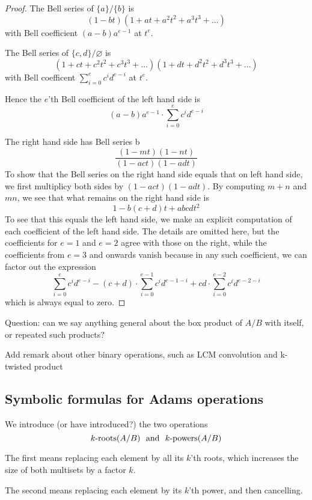 \begin{proof}
The Bell series of $\{  a \} / \{ b \}$ is 
$$(1-bt) (1+at+a^2 t^2 + a^3 t^3 + \ldots)$$
with Bell coefficient $(a-b) a^{e-1}$ at $t^e$. 

The Bell series of $\{  c,d \} / \varnothing$ is 
$$   (1+ct+c^2 t^2 + c^3 t^3 + \ldots) (1+dt+d^2 t^2 + d^3 t^3 + \ldots)  $$
with Bell coefficent $\sum_{i=0}^e c^i d^{e-i}$ at $t^e$.

Hence the $e$'th Bell coefficient of the left hand side is
$$   (a-b) a^{e-1} \cdot \sum_{i=0}^e c^i d^{e-i}  $$

The right hand side has Bell series
b$$  \frac{(1-mt)(1-nt)}{(1-act) ( 1-adt)}  $$
To show that the Bell series on the right hand side equals that on left hand side, we first multiplicy both sides by $(1-act) ( 1-adt)$. By computing $m+n$ and $mn$, we see that what remains on the right hand side is 
$$  1 - b(c+d) t + abcd t^2 $$
To see that this equals the left hand side, we make an explicit computation of each coefficient of the left hand side. The details are omitted here, but the coefficients for $e=1$ and $e=2$ agree with those on the right, while the coefficients from $e=3$ and onwards vanish because in any such coefficient, we can factor out the expression
$$   \sum_{i=0}^e c^i d^{e-i} - (c+d) \cdot \sum_{i=0}^{e-1} c^i d^{e-1-i} + cd \cdot \sum_{i=0}^{e-2} c^i d^{e-2-i}  $$
which is always equal to zero.
\end{proof}



Question: can we say anything general about the box product of $A/B$ with itself, or repeated such products?

Add remark about other binary operations, such as LCM convolution and k-twisted product



\subsection{Symbolic formulas for Adams operations}

We introduce (or have introduced?) the two operations
$$ \roots{k}(A/B)   \ \ \text{and} \ \ \powers{k}(A/B)$$

The first means replacing each element by all its $k$'th roots, which increases the size of both multisets by a factor $k$.

The second means replacing each element by its $k$'th power, and then cancelling.

